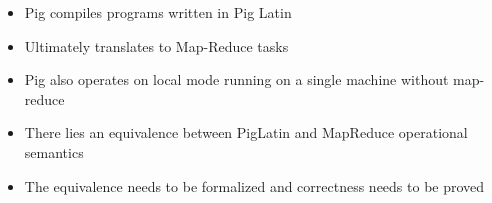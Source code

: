 \begin{frame}
\begin{itemize}
	\item Pig compiles programs written in Pig Latin
	\item Ultimately translates to Map-Reduce tasks
	\item Pig also operates on local mode running on a single machine without map-reduce
	\item There lies an equivalence between PigLatin and MapReduce operational semantics
	\item The equivalence needs to be formalized and correctness needs to be proved  
\end{itemize}
\end{frame}
